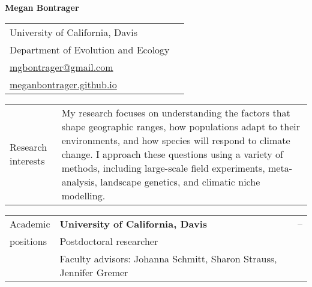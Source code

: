 \documentclass[letterpaper,11pt,oneside]{article}
\begin{document}



\noindent  \LARGE{\textbf{Megan Bontrager}} 

\normalsize

\bigskip

\noindent \begin{tabular}{@{} p{8cm} >{\raggedleft\arraybackslash}p{8.11cm}}
University of California, Davis & \\
Department of Evolution and Ecology & \\
{\href{mailto:mgbontrager@gmail.com}{mgbontrager@gmail.com}} & \\
{\href{https://meganbontrager.github.io}{meganbontrager.github.io}} & \\

\end{tabular}
\vspace{1em}


\noindent\hrulefill 

\bigskip
\bigskip



\noindent \begin{tabular}{@{} p{3cm} p{13.11cm}}
\Large{Research interests} & My research focuses on understanding the factors that shape geographic ranges, how populations adapt to their environments, and how species will respond to climate change. I approach these questions using a variety of methods, including large-scale field experiments, meta-analysis, landscape genetics, and climatic niche modelling. \\
\end{tabular}
\bigskip



\noindent \begin{tabular}{@{} p{3cm} p{10.91cm} >{\raggedleft\arraybackslash}p{1.7cm}}
\Large{Academic}    & \textbf{University of California, Davis} & 2018--\hspace*{0.8cm} \\
\Large{positions}   & Postdoctoral researcher & \\
& \raggedright{Faculty advisors: Johanna Schmitt, Sharon Strauss, Jennifer Gremer} & \\
\end{tabular}
\bigskip


\end{document}
